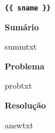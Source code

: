 \documentclass{article}
\begin{document}
{\centering\bf \verb"{{ sname }}" }

\noindent\textbf{Sumário}

{{ summtxt  }}

\noindent\textbf{Problema}

{{ probtxt }} 

\noindent\textbf{Resolução}

{{ answtxt  }}
\end{document}
